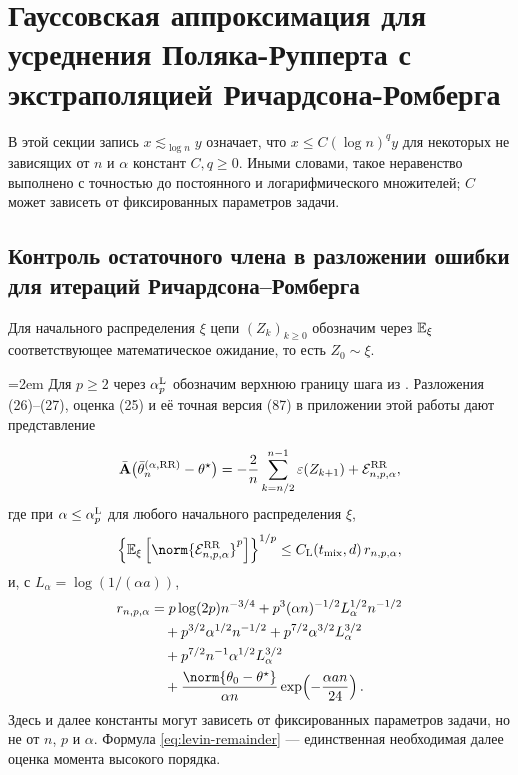 \section{Гауссовская аппроксимация для усреднения Поляка-Рупперта с экстраполяцией Ричардсона-Ромберга}\label{sec:theory}

В этой секции запись $x\lesssim_{\log{n}}y$ означает, что
$x\leq C(\log n)^q y$ для некоторых не зависящих от $n$ и $\alpha$
констант $C,q\geq0$. Иными словами, такое неравенство выполнено с точностью
до постоянного и логарифмического множителей; $C$ может зависеть от
фиксированных параметров задачи.

\subsection*{Контроль остаточного члена в разложении ошибки для итераций Ричардсона--Ромберга}

Для начального распределения $\xi$ цепи $(Z_k)_{k\geq0}$ обозначим через
$\mathbb{E}_\xi$ соответствующее математическое ожидание, то есть $Z_0\sim\xi$.

\begingroup
\emergencystretch=2em
Для $p\geq2$ через $\alpha_p^{\rm L}$ обозначим верхнюю границу шага из
\cite[Теорема~2]{Levin2026}. Разложения (26)--(27), оценка (25) и её точная версия (87) в приложении этой
работы дают представление
\par
\endgroup
\begin{equation}\label{eq:levin-decomposition}
 \bar{\mathbf{A}}\bigl(\bar{\theta}_n^{(\alpha,\mathrm{RR})}-\theta^\star\bigr)
 =-\frac2n\sum_{k=n/2}^{n-1}\varepsilon(Z_{k+1})
   +\mathcal{E}_{n,p,\alpha}^{\mathrm{RR}},
\end{equation}
где при $\alpha\leq\alpha_p^{\rm L}$ для любого начального распределения
$\xi$,
\begin{equation}\label{eq:levin-remainder}
 \left\{\PE_\xi\left[
  \norm{\scrE_{n,p,\alpha}^{\RR}}^p
 \right]\right\}^{1/p}
 \leq C_{\rm L}(\taumix,d)\,r_{n,p,\alpha},
\end{equation}
и, с $L_\alpha=\log(1/(\alpha a))$,
\begin{align}\label{eq:levin-rate}
 r_{n,p,\alpha}
 &=p\log(2p)n^{-3/4}
 +p^3(\alpha n)^{-1/2}L_\alpha^{1/2}n^{-1/2}\notag\\
 &\quad+p^{3/2}\alpha^{1/2}n^{-1/2}
 +p^{7/2}\alpha^{3/2}L_\alpha^{3/2}\notag\\
 &\quad
 +p^{7/2}n^{-1}\alpha^{1/2}L_\alpha^{3/2}\notag\\
 &\quad
 +\frac{\norm{\thetainit-\thetalim}}{\alpha n}
   \exp\!\left(-\frac{\alpha an}{24}\right).
\end{align}
Здесь и далее константы могут зависеть от фиксированных параметров задачи,
но не от $n$, $p$ и $\alpha$. Формула \eqref{eq:levin-remainder} ---
единственная необходимая далее оценка момента высокого порядка.

